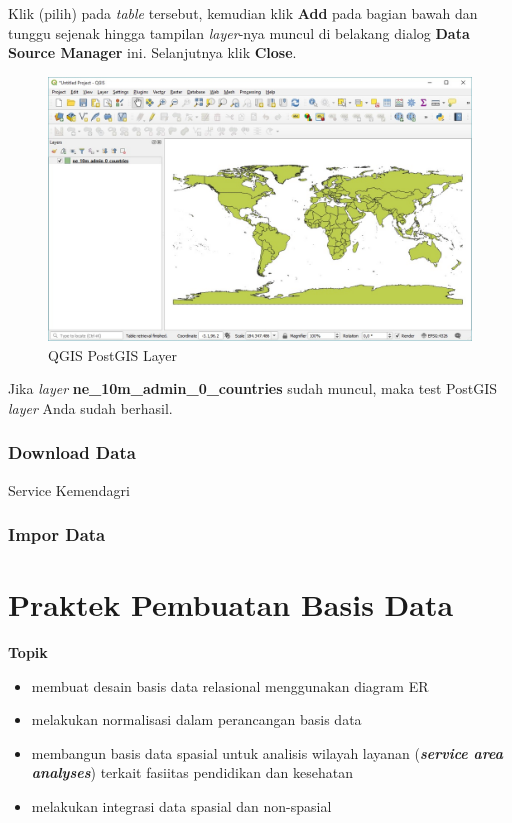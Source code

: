 \documentclass[]{book}
\providecommand{\tightlist}{%
  \setlength{\itemsep}{0pt}\setlength{\parskip}{0pt}}
\begin{document}
\begin{itemize}
  Klik (pilih) pada \emph{table} tersebut, kemudian klik \textbf{Add} pada bagian bawah dan tunggu sejenak hingga tampilan \emph{layer}-nya muncul di belakang dialog \textbf{Data Source Manager} ini. Selanjutnya klik \textbf{Close}.

  \begin{figure}
  \centering
  \includegraphics{./img/qgis-postgis-layer-loaded.jpg}
  \caption{QGIS PostGIS Layer}
  \end{figure}

  Jika \emph{layer} \textbf{ne\_10m\_admin\_0\_countries} sudah muncul, maka test PostGIS \emph{layer} Anda sudah berhasil.
\end{itemize}

\hypertarget{download-data}{%
\subsection{Download Data}\label{download-data}}

Service Kemendagri

\hypertarget{impor-data}{%
\subsection{Impor Data}\label{impor-data}}

\hypertarget{praktek-pembuatan-basis-data}{%
\chapter{Praktek Pembuatan Basis Data}\label{praktek-pembuatan-basis-data}}

\textbf{Topik}

\begin{itemize}
\tightlist
\item
  membuat desain basis data relasional menggunakan diagram ER
\item
  melakukan normalisasi dalam perancangan basis data
\item
  membangun basis data spasial untuk analisis wilayah layanan (\emph{\textbf{service area analyses}}) terkait fasiitas pendidikan dan kesehatan
\item
  melakukan integrasi data spasial dan non-spasial
\end{itemize}
\end{document}

